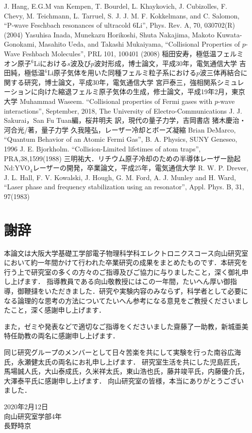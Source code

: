 \documentclass[11pt,a4j,notitlepage]{jreport}
\begin{document}
\begin{thebibliography}{99}
J. Hang, E.G.M van Kempen, T. Bourdel, L. Khaykovich, J. Cubizolles, F. Chevy, M. Teichmann, L. Tarruel, S. J. J. M. F. Kokkelmans, and C. Salomon, ``P-wave Feschbach resonances of ultracold 6Li'', Phys. Rev. A, 70, 030702(R) (2004)
Yasuhisa Inada, Munekazu Horikoshi, Shuta Nakajima, Makoto Kuwata-Gonokami, Masahito Ueda, and Takashi Mukaiyama, ``Collisional Properties of $p$-Wave Feshbach Molecules'', PRL 101, 100401 (2008)
 稲田安寿，極低温フェルミオン原子$^{6}$Liにおける$s$波及び$p$波対形成，博士論文，平成30年，電気通信大学
 吉田純，極低温$^{6}$Li原子気体を用いた同種フェルミ粒子系における$p$波三体再結合に関する研究，博士論文，平成30年，電気通信大学
 宮戸泰三，強相関系シミュレーションに向けた縮退フェルミ原子気体の生成，修士論文，平成19年2月，東京大学
Muhammad Waseem. ``Collisional properties of Fermi gases with $p$-wave interactions'', September, 2018, The University of Electro-Communications
 J. J. Sakurai，San Fu Tuan編，桜井明夫 訳，現代の量子力学，吉岡書店
 猪木慶治・河合光/著，量子力学
 久我隆弘，レーザー冷却とボーズ凝縮
 Brian DeMarco, ``Quantum Behavior of an Atomic Fermi Gas'', B. A. Physics, SUNY Geneseo, 1996
J. E. Bjorkholm. ``Collision-Limited lifetimes of atom traps'', PRA,38,1599(1988)
三明祐大．リチウム原子冷却のための半導体レーザー励起Nd:YVO$_4$レーザーの開発，卒業論文，平成25年，電気通信大学
R. W. P. Drever, J. L. Hall, F. V. Kowalski, J. Hough, G. M. Ford, A. J. Munley and H. Ward, ``Laser phase and frequency stabilization using an resonator'', Appl. Phys. B, 31, 97(1983)
\end{thebibliography}

\chapter*{謝辞}
\begin{spacing}{1.2}
本論文は大阪大学基礎工学部電子物理科学科エレクトロニクスコース向山研究室において約一年間かけて行われた卒業研究の成果をまとめたものです．本研究を行う上で研究室の多くの方々のご指導及びご協力に与りましたこと，深く御礼申し上げます．
指導教員である向山敬教授にはこの一年間，たいへん厚い御指導，御鞭撻をいただきました．研究や実験内容のみならず，科学者として必要になる論理的な思考の方法についてたいへん参考になる意見をご教授くださいましたこと，深く感謝申し上げます．

また，ゼミや発表などで適切なご指導をくださいました齋藤了一助教，新城亜美特任助教の両名に感謝申し上げます．

同じ研究グループのメンバーとして日々苦楽を共にして実験を行った南谷広海氏，永瀬健太氏の両名にお礼申し上げます．
研究室生活を共にした児島匠氏，馬場誠人氏，大山泰成氏，久米祥太氏，東山浩也氏，藤井竣平氏，内藤優介氏，大澤泰平氏に感謝申し上げます．
向山研究室の皆様，本当にありがとうございました．
\end{spacing}
 
\begin{flushright}
2020年2月12日\\
向山研究室学部4年\\
長野時京
\end{flushright}
\end{document}
